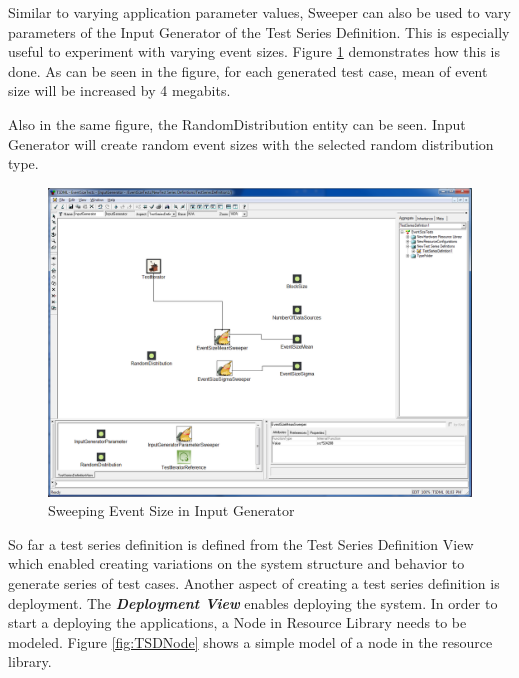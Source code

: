 Similar to varying application parameter values, Sweeper can also be used to vary parameters of the Input Generator of the Test Series Definition. This is especially useful to experiment with varying event sizes. Figure \ref{fig:TSDInput} demonstrates how this is done.  As can be seen in the figure, for each generated test case, mean of event size will be increased by 4 megabits.

Also in the same figure, the RandomDistribution entity can be seen. Input Generator will create random event sizes with the selected random distribution type.

\begin{figure}
	\centering
		\includegraphics[width=1.00\textwidth]{figures/TSDInput.png}
	\caption{Sweeping Event Size in Input Generator}
	\label{fig:TSDInput}
\end{figure}

So far a test series definition is defined from the Test Series Definition View which enabled creating variations on the system structure and behavior to generate series of test cases. Another aspect of creating a test series definition is deployment. The \textit{\textbf{Deployment View}} enables deploying the system. In order to start a deploying the applications, a Node in Resource Library needs to be modeled. Figure \ref{fig:TSDNode} shows a simple model of a node in the resource library.

